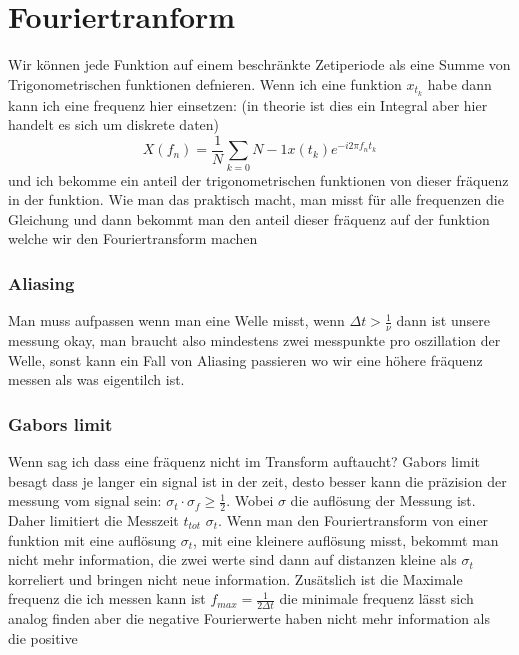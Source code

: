 \documentclass{article}
\begin{document}
\section*{Fouriertranform}
Wir können jede Funktion auf einem beschränkte Zetiperiode als eine Summe von Trigonometrischen funktionen defnieren. Wenn ich eine funktion $x_{t_k}$ habe dann kann ich eine frequenz hier einsetzen: (in theorie ist dies ein Integral aber hier handelt es sich um diskrete daten)
\[X(f_n)=\frac{1}{N}\sum_{k=0}{N-1}x(t_k)e^{-i2\pi f_nt_k}\]
und ich bekomme ein anteil der trigonometrischen funktionen von dieser fräquenz in der funktion.\newline
Wie man das praktisch macht, man misst für alle frequenzen die Gleichung und dann bekommt man den anteil dieser fräquenz auf der funktion welche wir den Fouriertransform machen
\subsubsection*{Aliasing} Man muss aufpassen wenn man eine Welle misst, wenn $\Delta t>\frac{1}{\nu}$ dann ist unsere messung okay, man braucht also mindestens zwei messpunkte pro oszillation der Welle, sonst kann ein Fall von Aliasing passieren wo wir eine höhere fräquenz messen als was eigentilch ist.
\subsubsection*{Gabors limit} Wenn sag ich dass eine fräquenz nicht im Transform auftaucht? Gabors limit besagt dass je langer ein signal ist in der zeit, desto besser kann die präzision der messung vom signal sein: $\sigma_t\cdot\sigma_f\ge\frac{1}{2}$. Wobei $\sigma$ die auflösung der Messung ist.
Daher limitiert die Messzeit $t_{tot}$ $\sigma_t$. Wenn man den Fouriertransform von einer funktion mit eine auflösung $\sigma_t$, mit eine kleinere auflösung misst, bekommt man nicht mehr information, die zwei werte sind dann auf distanzen kleine als $\sigma_t$ korreliert und bringen nicht neue information.
Zusätslich ist die Maximale frequenz die ich messen kann ist $f_{max}=\frac{1}{2\Delta t}$ die minimale frequenz lässt sich analog finden aber die negative Fourierwerte haben nicht mehr information als die positive
\end{document}
